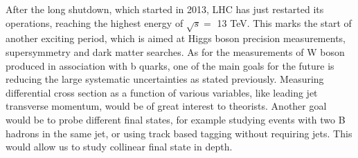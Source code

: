 After the long shutdown, which started in 2013, LHC has just restarted its operations, reaching the highest energy of $\sqrt{s}=$ 13 TeV. This marks the start of another exciting period, which is aimed at Higgs boson precision measurements, supersymmetry and dark matter searches. As for the measurements of W boson produced in association with b quarks, one of the main goals for the future is reducing the large systematic uncertainties as stated previously. Measuring differential cross section as a function of various variables, like leading jet transverse momentum, would be of great interest to theorists. Another goal would be to probe different final states, for example studying events with two B hadrons in the same jet, or using track based tagging without requiring jets. This would allow us to study collinear final state in depth.

